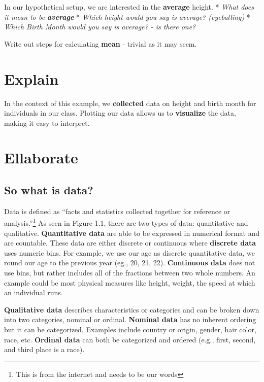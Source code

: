 \documentclass[
]{book}
\begin{document}
In our hypothetical setup, we are interested in the \textbf{average} height.
* \emph{What does it mean to be} \textbf{\emph{average}}
* \emph{Which height would you say is average? (eyeballing)}
* \emph{Which Birth Month would you say is average? - is there one?}

Write out steps for calculating \textbf{mean} - trivial as it may seem.

\hypertarget{explain-2}{%
\section*{Explain}\label{explain-2}}

In the context of this example, we \textbf{collected} data on height and birth month for individuals in our class.
Plotting our data allows us to \textbf{visualize} the data, making it easy to interpret.

\hypertarget{ellaborate}{%
\section*{Ellaborate}\label{ellaborate}}

\hypertarget{so-what-is-data}{%
\subsection{So what is data?}\label{so-what-is-data}}

Data is defined as ``facts and statistics collected together for
reference or analysis.''\footnote{This is from the internet and needs to
  be our words} As seen in Figure 1.1, there are two types of data:
quantitative and qualitative. \textbf{Quantitative data} are able to
be expressed in numerical format and are countable. These data
are either discrete or continuous where \textbf{discrete data} uses
numeric bins. For example, we use our age as discrete
quantitative data, we round our age to the previous year (eg.,
20, 21, 22). \textbf{Continuous data} does not use bins, but rather
includes all of the fractions between two whole numbers. An
example could be most physical measures like height, weight, the
speed at which an individual runs.

\textbf{Qualitative data} describes characteristics or categories and
can be broken down into two categories, nominal or ordinal.
\textbf{Nominal data} has no inherent ordering but it can be
categorized. Examples include country or origin, gender, hair
color, race, etc. \textbf{Ordinal data} can both be categorized and
ordered (e.g., first, second, and third place is a race).
\end{document}
